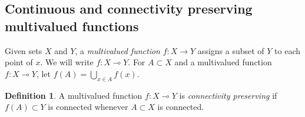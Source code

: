 \documentclass{article}
\theoremstyle{plain}
\theoremstyle{definition}
\newtheorem{definition}[thm]{Definition}
\numberwithin{thm}{section}
\begin{document}
\begin{comment}
The paper~\cite{BoSt1} introduces three generalizations of homotopy type,
called \em{homotopic similarity}, \em{long homotopy type}, and {\em real homotopy type}. Each of these
is shown to coincide with homotopy type for finite
digital images. In~\cite{Boxer16a}, it is shown that
each of these is preserved by the $NP_v$-adjacency.


\begin{definition}
\label{htpy-sim-def}
\rm{\cite{BoSt1}}
Let $X$ and $Y$ be digital images.
We say $(X,\kappa)$ and $(Y,\lambda)$
are {\rm homotopically similar}, denoted
$X \simeq_{\kappa,\lambda}^s Y$, if
there exist subsets
$\{X_j\}_{j=1}^{\infty}$ of $X$ and
$\{Y_j\}_{j=1}^{\infty}$ of $Y$ such that:
\begin{itemize}
\item $X = \bigcup_{j=1}^{\infty} X_j$, 
$Y = \bigcup_{j=1}^{\infty} Y_j$, 
and, for all $j$,
$X_j \subset X_{j+1}$,
$Y_j \subset Y_{j+1}$. 
\item There are continuous functions
      $f_j: X_j \rightarrow Y_j$, 
      $g_j: Y_j \rightarrow X_j$ such that
      $g_j \circ f_j \simeq_{\kappa,\kappa} 1_{X_j}$ and
      $f_j \circ g_j \simeq_{\lambda,\lambda} 1_{Y_j}$.
\item For $v \leq w$, 
      $f_w|X_v \simeq_{\kappa,\lambda} f_v$ in $Y_v$ and
      $g_w|Y_v \simeq_{\lambda,\kappa} g_v$ in $X_v$.
\end{itemize}

If all of these homotopies are pointed with respect to
some $x_1 \in X_1$ and $y_1 \in Y_1$,
we say $(X,x_1)$ and $(Y,y_1)$ are 
{\rm pointed homotopically similar},
denoted $(X,x_1) \simeq_{\kappa,\lambda}^s (Y,y_1)$
or $(X,x_1) \simeq^s (Y,y_1)$ when $\kappa$ and
$\lambda$ are understood.
$\Box$
\end{definition}

\todo{Def of long htpy type}
\end{comment}

\subsection{Continuous and connectivity preserving multivalued functions}
Given sets $X$ and $Y$, a \emph{multivalued function} $f:X\to Y$ assigns a subset of $Y$ to each point of $x$. We will  write $f:X \multimap Y$. For $A \subset X$ and a multivalued function $f:X\multimap Y$, let $f(A) = \bigcup_{x \in A} f(x)$. 

\begin{definition}
\label{mildly}
\rm{\cite{Kovalevsky}}
A multivalued function $f:X\multimap Y$ is \emph{connectivity preserving} if $f(A)\subset Y$ is connected whenever $A\subset X$ is connected.
\end{definition}
\end{document}
